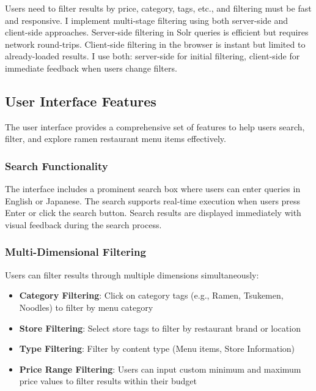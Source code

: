 \documentclass[11pt,a4paper]{article}
\begin{document}
Users need to filter results by price, category, tags, etc., and filtering must be fast and responsive. I implement multi-stage filtering using both server-side and client-side approaches. Server-side filtering in Solr queries is efficient but requires network round-trips. Client-side filtering in the browser is instant but limited to already-loaded results. I use both: server-side for initial filtering, client-side for immediate feedback when users change filters.

\subsection{User Interface Features}

The user interface provides a comprehensive set of features to help users search, filter, and explore ramen restaurant menu items effectively.

\subsubsection{Search Functionality}

The interface includes a prominent search box where users can enter queries in English or Japanese. The search supports real-time execution when users press Enter or click the search button. Search results are displayed immediately with visual feedback during the search process.

\subsubsection{Multi-Dimensional Filtering}

Users can filter results through multiple dimensions simultaneously:

\begin{itemize}
    \item \textbf{Category Filtering}: Click on category tags (e.g., Ramen, Tsukemen, Noodles) to filter by menu category
    \item \textbf{Store Filtering}: Select store tags to filter by restaurant brand or location
    \item \textbf{Type Filtering}: Filter by content type (Menu items, Store Information)
    \item \textbf{Price Range Filtering}: Users can input custom minimum and maximum price values to filter results within their budget
\end{itemize}
\end{document}
